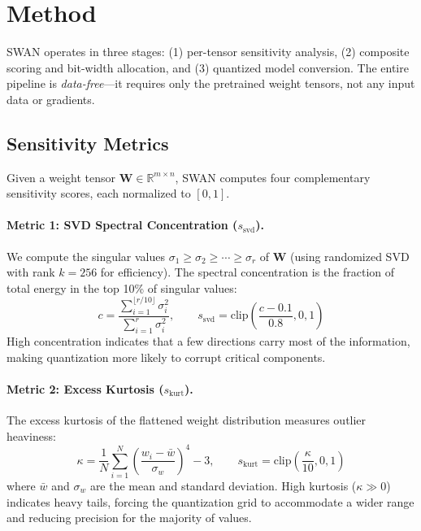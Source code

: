 \documentclass{article}
\begin{document}
\section{Method}
\label{sec:method}

SWAN operates in three stages: (1) per-tensor sensitivity analysis, (2) composite scoring and bit-width allocation, and (3) quantized model conversion. The entire pipeline is \emph{data-free}---it requires only the pretrained weight tensors, not any input data or gradients.

\subsection{Sensitivity Metrics}

Given a weight tensor $\mathbf{W} \in \mathbb{R}^{m \times n}$, SWAN computes four complementary sensitivity scores, each normalized to $[0, 1]$.

\paragraph{Metric 1: SVD Spectral Concentration ($s_\text{svd}$).}
We compute the singular values $\sigma_1 \geq \sigma_2 \geq \cdots \geq \sigma_r$ of $\mathbf{W}$ (using randomized SVD with rank $k = 256$ for efficiency). The spectral concentration is the fraction of total energy in the top 10\% of singular values:
\begin{equation}
    c = \frac{\sum_{i=1}^{\lfloor r/10 \rfloor} \sigma_i^2}{\sum_{i=1}^{r} \sigma_i^2}, \qquad
    s_\text{svd} = \text{clip}\!\left(\frac{c - 0.1}{0.8}, 0, 1\right)
\end{equation}
High concentration indicates that a few directions carry most of the information, making quantization more likely to corrupt critical components.

\paragraph{Metric 2: Excess Kurtosis ($s_\text{kurt}$).}
The excess kurtosis of the flattened weight distribution measures outlier heaviness:
\begin{equation}
    \kappa = \frac{1}{N}\sum_{i=1}^{N}\left(\frac{w_i - \bar{w}}{\sigma_w}\right)^4 - 3, \qquad
    s_\text{kurt} = \text{clip}\!\left(\frac{\kappa}{10}, 0, 1\right)
\end{equation}
where $\bar{w}$ and $\sigma_w$ are the mean and standard deviation. High kurtosis ($\kappa \gg 0$) indicates heavy tails, forcing the quantization grid to accommodate a wider range and reducing precision for the majority of values.
\end{document}
